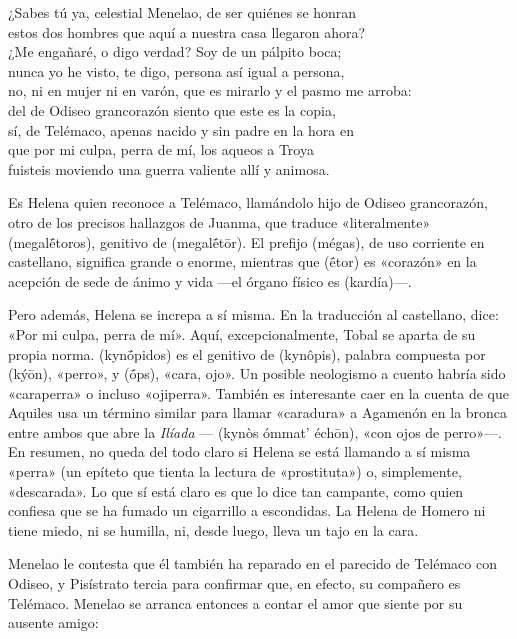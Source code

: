 \begin{versocita}
¿Sabes tú ya, celestial Menelao, de ser quiénes se honran\\
estos dos hombres que aquí a nuestra casa llegaron ahora?\\
¿Me engañaré, o digo verdad? Soy de un pálpito boca;\\
nunca yo he visto, te digo, persona así igual a persona,\\
no, ni en mujer ni en varón, que es mirarlo y el pasmo me arroba:\\
del de Odiseo grancorazón siento que este es la copia,\\
sí, de Telémaco, apenas nacido y sin padre en la hora en\\
que por mi culpa, perra de mí, los aqueos a Troya\\
fuisteis moviendo una guerra valiente allí y animosa.
\end{versocita}

Es Helena quien reconoce a Telémaco, llamándolo hijo de Odiseo grancorazón, otro de los precisos hallazgos de Juanma, que traduce «literalmente»  (megalḗtoros), genitivo de  (megalḗtōr). El prefijo  (mégas), de uso corriente en castellano, significa grande o enorme, mientras que  (ḗtor) es «corazón» en la acepción de sede de ánimo y vida ---el órgano físico es  (kardía)---.

Pero además, Helena se increpa a sí misma. En la traducción al castellano, dice: «Por mi culpa, perra de mí». Aquí, excepcionalmente, Tobal se aparta de su propia norma.  (kynṓpidos) es el genitivo de  (kynôpis), palabra compuesta por  (kýōn), «perro», y  (ṓps), «cara, ojo». Un posible neologismo a cuento habría sido «caraperra» o incluso «ojiperra». También es interesante caer en la cuenta de que Aquiles usa un término similar para llamar «caradura» a Agamenón en la bronca entre ambos que abre la \emph{Ilíada} --- (kynòs ómmat' échōn), «con ojos de perro»---. En resumen, no queda del todo claro si Helena se está llamando a sí misma «perra» (un epíteto que tienta la lectura de «prostituta») o, simplemente, «descarada». Lo que sí está claro es que lo dice tan campante, como quien confiesa que se ha fumado un cigarrillo a escondidas. La Helena de Homero ni tiene miedo, ni se humilla, ni, desde luego, lleva un tajo en la cara.

Menelao le contesta que él también ha reparado en el parecido de Telémaco con Odiseo, y Pisístrato tercia para confirmar que, en efecto, su compañero es Telémaco. Menelao se arranca entonces a contar el amor que siente por su ausente amigo:


